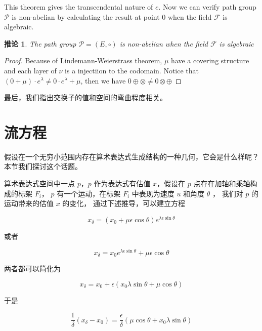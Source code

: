 \documentclass[a4paper,12pt]{article}
\numberwithin{definition}{section}
\numberwithin{lemma}{section}
\numberwithin{proposition}{section}
\numberwithin{theorem}{section}
\numberwithin{grammar}{section}
\numberwithin{program}{section}
\numberwithin{convention}{section}
\newtheorem{corollary}{推论}
\numberwithin{corollary}{section}
\begin{document}
This theorem gives the transcendental nature of $e$.
Now we can verify path group $\mathcal{P}$ is non-abelian by calculating the result at point $0$ when the field $\mathcal{F}$ is algebraic.

\begin{corollary}
\label{corollary:nonabelian}
The path group $\mathcal{P} = (E, \circ)$ is non-abelian when the field $\mathcal{F}$ is algebraic
\end{corollary}

\begin{proof}
Because of Lindemann-Weierstrass theorem, $\mu$ have a covering structure and each layer of $\nu$ is a injectiion to the codomain.
Notice that $(0 + \mu) \cdot e^\lambda \neq 0 \cdot e^\lambda + \mu$, then we have $0 \oplus \otimes \neq 0 \otimes \oplus$
\qedhere
\end{proof}


最后，我们指出交换子的值和空间的弯曲程度相关。

\section{流方程}

假设在一个无穷小范围内存在算术表达式生成结构的一种几何，它会是什么样呢？本节我们探讨这个话题。

算术表达式空间中一点 $p$，$p$ 作为表达式有估值 $x$，假设在 $p$ 点存在加轴和乘轴构成的标架 $F_i$，
$p$ 有一个运动，在标架 $F_i$ 中表现为速度 $u$ 和角度 $\theta$ ， 我们对 $p$ 的运动带来的估值 $x$ 的变化，
通过下述推导，可以建立方程

\begin{equation}
    x_{\delta} = (x_0 + \mu \epsilon \cos \theta)e^{\lambda \epsilon \sin \theta}
\end{equation}

或者

\begin{equation}
    x_{\delta} = x_0 e^{\lambda \epsilon \sin \theta} + \mu \epsilon \cos \theta
\end{equation}

两者都可以简化为

\begin{equation}
    x_{\delta} = x_0 + \epsilon (x_0 \lambda \sin \theta + \mu \cos \theta)
\end{equation}

于是

\begin{equation}
    \frac{1}{\delta} (x_{\delta} - x_0) = \frac{\epsilon}{\delta} (\mu \cos \theta + x_0 \lambda \sin \theta)
\end{equation}
\end{document}
